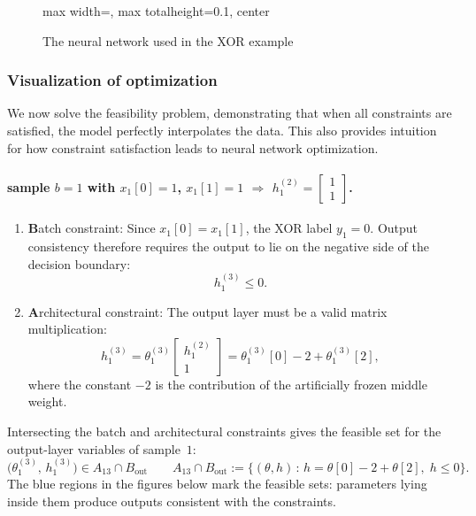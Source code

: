 \begin{figure}[ht]
\centering
\begin{adjustbox}{max width=\textwidth, max totalheight=0.1\textheight, center}

\end{adjustbox}
\caption{The neural network used in the XOR example}
\end{figure}

\subsubsection{Visualization of optimization}
We now solve the feasibility problem, demonstrating that when all constraints are satisfied, the model perfectly interpolates the data. This also provides intuition for how constraint satisfaction leads to neural network optimization.
\paragraph{sample $b=1$ with $x_1[0]=1$, $x_1[1]=1$ $\Rightarrow$
$h_1^{(2)} =\begin{bmatrix} 1 \\ 1 \end{bmatrix}$.}

\begin{enumerate}
  \item \textbf{B}atch constraint: Since $x_1[0]=x_1[1]$, the XOR label $y_1=0$. Output consistency therefore requires the output to lie on the negative side of the decision boundary:
\begin{equation*}
h_1^{(3)} \le 0.
\end{equation*}

\item \textbf{A}rchitectural constraint: The output layer must be a valid matrix multiplication:
\begin{equation*}
h_1^{(3)} = \theta_1^{(3)} \begin{bmatrix} h_1^{(2)} \\ 1 \end{bmatrix}
= \theta_1^{(3)}[0] - 2 + \theta_1^{(3)}[2],
\end{equation*}
where the constant $-2$ is the contribution of the artificially frozen middle weight.
\end{enumerate}
Intersecting the batch and architectural
constraints gives the feasible set for the output-layer variables of
sample~$1$:
\begin{equation*}
  \bigl(\theta_1^{(3)},\, h_1^{(3)}\bigr) \in A_{13}  \cap B_{\mathrm{out}} \qquad
  A_{13}  \cap B_{\mathrm{out}} := \bigl\{(\theta,h) \,:\, h = \theta[0] - 2 + \theta[2],\; h \le 0\bigr\}.
\end{equation*}
The blue regions in the figures below mark the feasible sets: parameters lying inside them produce outputs consistent with the constraints.

